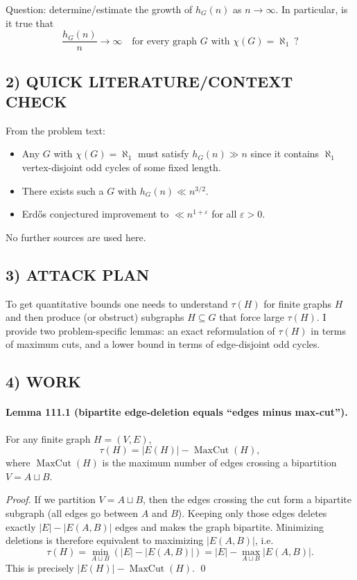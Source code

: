 Question: determine/estimate the growth of $h_G(n)$ as $n\to\infty$.  In particular, is it true that
\[
\frac{h_G(n)}{n}\to\infty\quad\text{for every graph $G$ with }\chi(G)=\aleph_1\ ?
\]

\subsection*{2) QUICK LITERATURE/CONTEXT CHECK}
From the problem text:
\begin{itemize}
\item Any $G$ with $\chi(G)=\aleph_1$ must satisfy $h_G(n)\gg n$ since it contains $\aleph_1$ vertex-disjoint odd cycles of some fixed length.
\item There exists such a $G$ with $h_G(n)\ll n^{3/2}$.
\item Erd\H{o}s conjectured improvement to $\ll n^{1+\varepsilon}$ for all $\varepsilon>0$.
\end{itemize}
No further sources are used here.

\subsection*{3) ATTACK PLAN}
To get quantitative bounds one needs to understand $\tau(H)$ for finite graphs $H$ and then produce (or obstruct) subgraphs $H\subseteq G$ that force large $\tau(H)$.
I provide two problem-specific lemmas: an exact reformulation of $\tau(H)$ in terms of maximum cuts, and a lower bound in terms of edge-disjoint odd cycles.

\subsection*{4) WORK}
\paragraph{Lemma 111.1 (bipartite edge-deletion equals ``edges minus max-cut'').}
For any finite graph $H=(V,E)$,
\[
\tau(H)=|E(H)|-\operatorname{MaxCut}(H),
\]
where $\operatorname{MaxCut}(H)$ is the maximum number of edges crossing a bipartition $V=A\sqcup B$.

\emph{Proof.}
If we partition $V=A\sqcup B$, then the edges crossing the cut form a bipartite subgraph (all edges go between $A$ and $B$).  Keeping only those edges deletes exactly $|E|-|E(A,B)|$ edges and makes the graph bipartite.  Minimizing deletions is therefore equivalent to maximizing $|E(A,B)|$, i.e.
\[
\tau(H)=\min_{A\sqcup B} (|E|-|E(A,B)|)=|E|-\max_{A\sqcup B}|E(A,B)|.
\]
This is precisely $|E(H)|-\operatorname{MaxCut}(H)$. \qed

